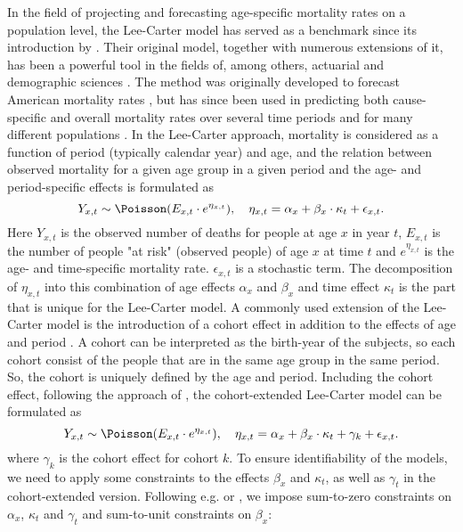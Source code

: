 In the field of projecting and forecasting age-specific mortality rates on a population level, the Lee-Carter model has served as a benchmark since its introduction by \textcite{LeeCarter1992}. Their original model, together with numerous extensions of it, has been a powerful tool in the fields of, among others, actuarial and demographic sciences \parencite{booth_tickle_2008}. The method was originally developed to forecast American mortality rates \parencite{LeeCarter1992}, but has since been used in predicting both cause-specific and overall mortality rates over several time periods and for many different populations \cite{GirosiKing2007}. 
\newline
\noindent In the Lee-Carter approach, mortality is considered as a function of period (typically calendar year) and age, and the relation between observed mortality for a given age group in a given period and the age- and period-specific effects is formulated as 
\begin{equation}
Y_{x,t} \sim \Poisson(E_{x,t}\cdot e^{\eta_{x,t}}), \quad \eta_{x,t}= \alpha_x + \beta_x\cdot\kappa_t + \epsilon_{x,t}.
\label{eq:LC-model}
\end{equation}
Here $Y_{x,t}$ is the observed number of deaths for people at age $x$ in year $t$, $E_{x,t}$ is the number of people "at risk" (observed people) of age $x$ at time $t$ and $e^{\eta_{x,t}}$ is the age- and time-specific mortality rate. $\epsilon_{x,t}$ is a stochastic term. The decomposition of $\eta_{x,t}$ into this combination of age effects $\alpha_x$ and $\beta_x$ and time effect $\kappa_t$ is the part that is unique for the Lee-Carter model.
\newline
\noindent A commonly used extension of the Lee-Carter model is the introduction of a cohort effect in addition to the effects of age and period \cite{Wisniowski2015}. A cohort can be interpreted as the birth-year of the subjects, so each cohort consist of the people that are in the same age group in the same period. So, the cohort is uniquely defined by the age and period. Including the cohort effect, following the approach of \citet{Wisniowski2015}, the cohort-extended Lee-Carter model can be formulated as
\begin{equation}
    Y_{x,t} \sim \Poisson(E_{x,t}\cdot e^{\eta_{x,t}}), \quad \eta_{x,t} = \alpha_x + \beta_x \cdot \kappa_t + \gamma_k + \epsilon_{x,t}.
    \label{eq:LCC-model-orig}
\end{equation}
where $\gamma_k$ is the cohort effect for cohort $k$. 
To ensure identifiability of the models, we need to apply some constraints to the effects $\beta_x$ and $\kappa_t$, as well as $\gamma_t$ in the cohort-extended version. Following e.g. \citet{Wisniowski2015} or \citet{LeeCarter1992}, we impose sum-to-zero constraints on $\alpha_x$, $\kappa_t$ and $\gamma_t$ and sum-to-unit constraints on $\beta_x$:
